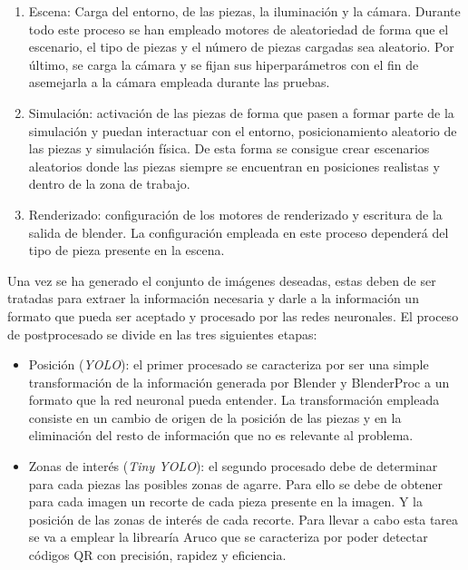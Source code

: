 {\begin{enumerate}
\item Escena: Carga del entorno, de las piezas, la iluminación y la cámara. Durante todo este proceso se han empleado motores de aleatoriedad de forma que el escenario, el tipo de piezas y el número de piezas cargadas sea aleatorio. Por último, se carga la cámara y se fijan sus hiperparámetros con el fin de asemejarla a la cámara empleada durante las pruebas.

\item Simulación: activación de las piezas de forma que pasen a formar parte de la simulación y puedan interactuar con el entorno, posicionamiento aleatorio de las piezas y simulación física. De esta forma se consigue crear escenarios aleatorios donde las piezas siempre se encuentran en posiciones realistas y dentro de la zona de trabajo.

\item Renderizado: configuración de los motores de renderizado y escritura de la salida de blender. La configuración empleada en este proceso dependerá del tipo de pieza presente en la escena.
\end{enumerate}

Una vez se ha generado el conjunto de imágenes deseadas, estas deben de ser tratadas para extraer la información necesaria y darle a la información un formato que pueda ser aceptado y procesado por las redes neuronales. El proceso de postprocesado se divide en las tres siguientes etapas:

\begin{itemize}
\item Posición (\textit{YOLO}): el primer procesado se caracteriza por ser una simple transformación de la información generada por Blender y BlenderProc a un formato que la red neuronal pueda entender. La transformación empleada consiste en un cambio de origen de la posición de las piezas y en la eliminación del resto de información que no es relevante al problema.

\item Zonas de interés (\textit{Tiny YOLO}): el segundo procesado debe de determinar para cada piezas las posibles zonas de agarre. Para ello se debe de obtener para cada imagen un recorte de cada pieza presente en la imagen. Y la posición de las zonas de interés de cada recorte. Para llevar a cabo esta tarea se va a emplear la librearía Aruco que se caracteriza por poder detectar códigos QR con precisión, rapidez y eficiencia.


\end{itemize}}
